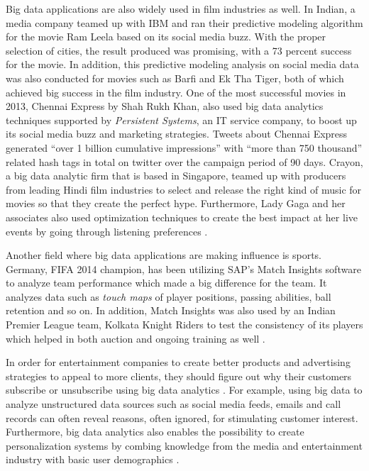 Big data applications are also widely used in film industries as well. In Indian, a media company teamed up with IBM and ran their predictive modeling algorithm for the movie Ram Leela based on its social media buzz. With the proper selection of cities, the result produced was promising, with a 73 percent success for the movie. In addition, this predictive modeling analysis on social media data was also conducted for movies such as Barfi and Ek Tha Tiger, both of which achieved big success in the film industry. One of the most successful movies in 2013, Chennai Express by Shah Rukh Khan, also used big data analytics techniques supported by {\em Persistent Systems}, an IT service company, to boost up its social media buzz and marketing strategies. Tweets about Chennai Express generated ``over 1 billion cumulative impressions'' \cite{Karania2014industry} with ``more than 750 thousand'' \cite{Karania2014industry} related hash tags in total on twitter over the campaign period of 90 days. Crayon, a big data analytic firm that is based in Singapore, teamed up with producers from leading Hindi film industries to select and release the right kind of music for movies so that they create the perfect hype. Furthermore, Lady Gaga and her associates also used optimization techniques to create the best impact at her live events by going through listening preferences \cite{Karania2014industry}.

Another field where big data applications are making influence is sports. Germany, FIFA 2014 champion, has been utilizing SAP's Match Insights software to analyze team performance which made a big difference for the team. It analyzes data such as {\em touch maps} of player positions, passing abilities, ball retention and so on. In addition, Match Insights was also used by an Indian Premier League team, Kolkata Knight Riders to test the consistency of its players which helped in both auction and ongoing training as well \cite{Karania2014industry}.

In order for entertainment companies to create better products and advertising strategies to appeal to more clients, they should figure out why their customers subscribe or unsubscribe using big data analytics \cite{Mehta2017entertainment}. For example, using big data to analyze unstructured data sources such as social media feeds, emails and call records can often reveal reasons, often ignored, for stimulating customer interest. Furthermore, big data analytics also enables the possibility to create personalization systems by combing knowledge from the media and entertainment industry with basic user demographics \cite{Mehta2017entertainment}.

